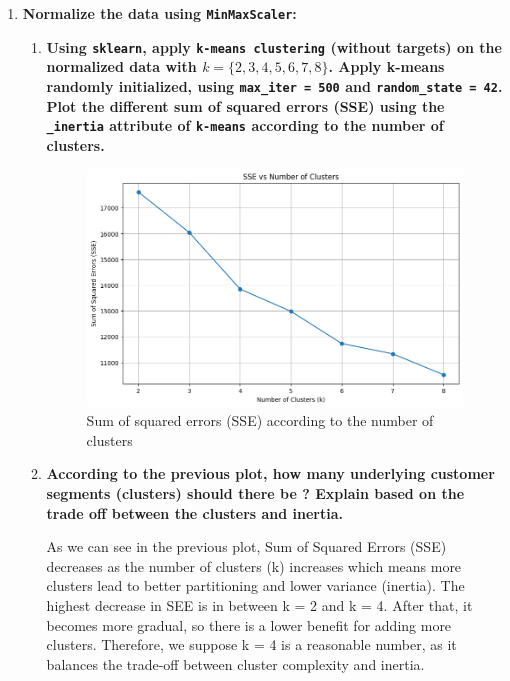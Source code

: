 \documentclass[12pt]{article}
\begin{document}
\begin{enumerate}
    \item \textbf{Normalize the data using \texttt{MinMaxScaler}:}
    
    \begin{enumerate}[label=\alph*)]
        \item \textbf{Using \texttt{sklearn}, apply \texttt{k-means clustering} (without targets) on the
        normalized data with \( k = \{2,3,4,5,6,7,8\} \). Apply k-means randomly initialized, using \texttt{max\_iter = 500}
        and \texttt{random\_state = 42}. Plot the different sum of squared errors (SSE) using the
        \texttt{\_inertia} attribute of \texttt{k-means} according to the number of clusters.}
    
        \vspace{20pt}
        

        \begin{figure}[H]
            \centering
            \includegraphics[width=12cm]{./Part II/1_a.png}
            \caption{Sum of squared errors (SSE) according to the number of clusters}
        \end{figure}

        \item \textbf{According to the previous plot, how many underlying customer segments (clusters)
        should there be ? Explain based on the trade off between the clusters and inertia.}

        \vspace{10pt}
        As we can see in the previous plot, Sum of Squared Errors (SSE) decreases as the number of clusters (k) increases which means more clusters lead to better partitioning and lower variance (inertia).
        The highest decrease in SEE is in between k = 2 and k = 4. After that, it becomes more gradual, so there is a lower benefit for adding more clusters. Therefore, we suppose k = 4 is a reasonable number, as it balances the trade-off between cluster complexity and inertia.
        

\end{enumerate}
\end{enumerate}
\end{document}
